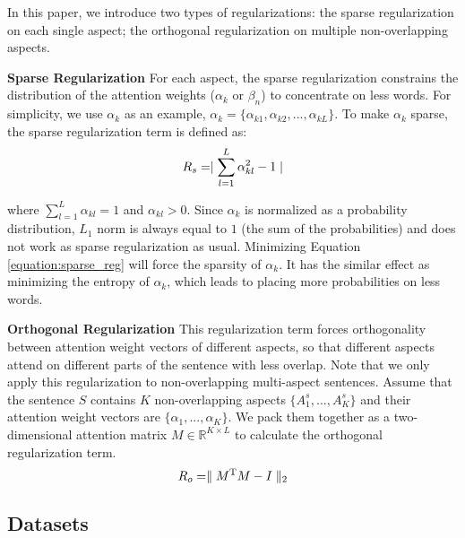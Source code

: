 \documentclass[11pt,a4paper]{article}
\begin{document}
In this paper, we introduce two types of regularizations: the sparse regularization on each single aspect; the orthogonal regularization on multiple non-overlapping aspects. 

{\bf Sparse Regularization} For each aspect, the sparse regularization constrains the distribution of the attention weights ($\alpha_k$ or $\beta_n$) to concentrate on less words. For simplicity, we use $\alpha_k$ as an example, $\alpha_k=\{\alpha_{k1},  \alpha_{k2}, ..., \alpha_{kL}\}$. To make $\alpha_k$ sparse, the sparse regularization term is defined as: 
\begin{equation} 
\setlength{\abovedisplayskip}{4pt}  %
\setlength{\belowdisplayskip}{4pt}  %
    R_s = \mid\sum\limits_{l=1}^L{\alpha_{kl}^{2}} - 1\mid
    \label{equation:sparse_reg}
\end{equation}

where $\sum\limits_{l=1}^L{\alpha_{kl}}=1$ and $\alpha_{kl}>0$. Since $\alpha_k$ is normalized as a probability distribution, $L_1$ norm is always equal to $1$ (the sum of the probabilities) and does not work as sparse regularization as usual. Minimizing Equation \ref{equation:sparse_reg} will force the sparsity of $\alpha_k$. It has the similar effect as minimizing the entropy of $\alpha_k$, which leads to placing more probabilities on less words.

{\bf Orthogonal Regularization} This regularization term forces orthogonality between attention weight vectors of different aspects, so that different aspects attend on different parts of the sentence with less overlap. Note that we only apply this regularization to non-overlapping multi-aspect sentences. Assume that the sentence $S$ contains $K$ non-overlapping aspects $\{A_1^s,...,A_K^s\}$ and their attention weight vectors are $\{\alpha_1,...,\alpha_K\}$. We pack them together as a two-dimensional attention matrix $M\in\mathbb{R}^{{K}\times{L}}$ to calculate the orthogonal regularization term.
\begin{equation}
\setlength{\abovedisplayskip}{4pt}  %
\setlength{\belowdisplayskip}{4pt}  %
	R_o = \parallel{M^{\mathrm{T}}}M - I\parallel_2
\end{equation}

\subsection{Datasets}
\end{document}
